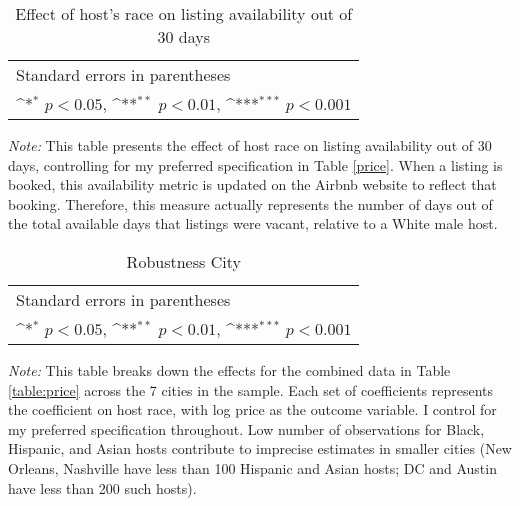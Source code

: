 \begin{table}[htbp]\centering
	\def\sym#1{\ifmmode^{#1}\else\(^{#1}\)\fi}
	\caption{Effect of host’s race on listing availability out of 30 days}
	\begin{tabular}{l*{1}{c}}
		\hline\hline
		
		\hline\hline
		\multicolumn{2}{l}{\footnotesize Standard errors in parentheses}\\
		\multicolumn{2}{l}{\footnotesize \sym{*} \(p<0.05\), \sym{**} \(p<0.01\), \sym{***} \(p<0.001\)}\\
	\end{tabular}
\label{table:availability}
	\begin{tablenotes}
		\item {\it Note:} This table presents the effect of host race on listing availability out of 30 days, controlling for my preferred specification in Table \ref{price}. When a listing is booked, this availability metric is updated on the Airbnb website to reflect that booking. Therefore, this measure actually represents the number of days out of the total available days that listings were vacant, relative to a White male host.
	\end{tablenotes}
\end{table}


\begin{table}[htbp]\centering
	\def\sym#1{\ifmmode^{#1}\else\(^{#1}\)\fi}
	\caption{Robustness City}
	\begin{tabular}{l*{7}{c}}
		\hline\hline
		
		\hline\hline
		\multicolumn{8}{l}{\footnotesize Standard errors in parentheses}\\
		\multicolumn{8}{l}{\footnotesize \sym{*} \(p<0.05\), \sym{**} \(p<0.01\), \sym{***} \(p<0.001\)}\\
	\end{tabular}
\label{table:robustcity}

	\begin{tablenotes}
		\item {\it Note:} This table breaks down the effects for the combined data in Table \ref{table:price} across the 7 cities in the sample. Each set of coefficients represents the coefficient on host race, with log price as the outcome variable. I control for my preferred specification throughout. Low number of observations for Black, Hispanic, and Asian hosts contribute to imprecise estimates in smaller cities (New Orleans, Nashville have less than 100 Hispanic and Asian hosts; DC and Austin have less than 200 such hosts). 
	\end{tablenotes}
\end{table}


